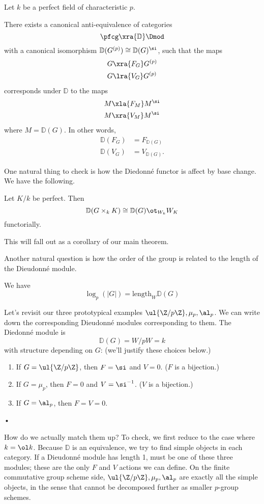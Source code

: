 \begin{thm}
Let $k$ be a perfect field of characteristic $p$.

There exists a canonical anti-equivalence of categories
\[
\pfcg \xra{\mathbb D} \Dmod
\]
with a canonical isomorphism $\mathbb D(G^{(p)})\cong \mathbb D (G)^{\si}$, such that the maps 
\begin{align*}
G&\xra{F_G} G^{(p)}\\
G & \lra{V_G} G^{(p)}
\end{align*}
corresponds under $\mathbb D$ to the maps 
\begin{align*}
M&\xla{F_M} M^{\si}\\
M& \xra{V_M} M^{\si}
\end{align*}
where $M=\mathbb D(G)$. In other words,
\begin{align*}
\mathbb D(F_G)&=F_{\mathbb D(G)}\\
\mathbb D(V_G)&=V_{\mathbb D(G)}.
\end{align*}
\end{thm}
One natural thing to check is how the Diedonn\'e functor is affect by base change. We have the following.
\begin{pr}
Let $K/k$ be perfect. Then
\[
\mathbb D(G\times_k K)\cong \mathbb D(G)\ot_{W_k}W_K
\]
functorially.
\end{pr}
This will fall out as a corollary of our main theorem.

Another natural question is how the order of the group is related to the length of the Dieudonn\'e module.
\begin{pr}
We have
\[
\log_p(|G|)=\text{length}_{W}\mathbb D(G)
\]
\end{pr}
\begin{ex}
Let's revisit our three prototypical examples $\ul{\Z/p\Z},\mu_p,\al_p$. We can write down the corresponding Dieudonn\'e modules corresponding to them. The Diedonn\'e module is 
\[
\mathbb D(G)=W/pW=k
\]
with structure depending on $G$: (we'll justify these choices below.)
\begin{enumerate}
\item
If $G=\ul{\Z/p\Z}$, then $F=\si$ and $V=0$. ($F$ is a bijection.)
\item
If $G=\mu_p$, then $F=0$ and $V=\si^{-1}$. ($V$ is a bijection.) 
\item
If $G=\al_p$, then $F=V=0$.
\end{enumerate}•
\end{ex}
How do we actually match them up? %
To check, we first reduce to the case where $k=\ol k$. 
Because $\mathbb D$ is an equivalence, we try to find simple objects in each category. If a Dieudonn\'e module has length 1, must be one of these three modules; these are the only $F$ and $V$ actions we can define.  %
On the finite commutative group scheme side, $\ul{\Z/p\Z},\mu_p,\al_p$ are exactly all the simple objects, in the sense that cannot be decomposed further as smaller $p$-group schemes.

